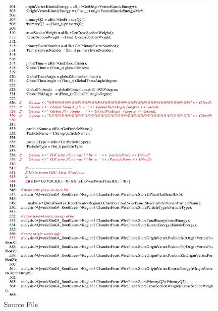 \begin{figure}[h]
  \hspace{0cm}
  \includegraphics[scale=0.8]{./figures13/QweakSimEventAction.cc-p9.eps}
  \caption{Source File}
           \label{fig:XIII-SC-24}
\end{figure}

\clearpage


